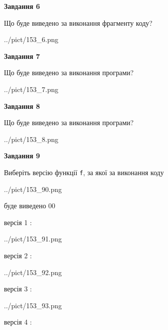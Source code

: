 \documentclass[12pt, ukrainian]{article}
\def\code#1{\Verb!#1!}
\begin{document}
{\begin {large}
{\begin {center}\textbf{Завдання 6}\end {center}}

Що буде виведено за виконання фрагменту коду?\par
\begin{center}
	{../pict/153_6.png}
\end{center}
\newpage

{\begin {center}\textbf{Завдання 7}\end {center}}

Що буде виведено за виконання програми?\par
\begin{center}
	{../pict/153_7.png}
\end{center}
\newpage

{\begin {center}\textbf{Завдання 8}\end {center}}

Що буде виведено за виконання програми?\par
\begin{center}
	{../pict/153_8.png}
\end{center}
\newpage

{\begin {center}\textbf{Завдання 9}\end {center}}

Виберіть версію функції \code{f}, за якої за виконання коду
\begin{center}
	{../pict/153_90.png}
\end{center}
буде виведено 00

\vspace{5mm}
версія 1 :

\begin{center}
	{../pict/153_91.png}
\end{center}
версія 2 :

\begin{center}
	{../pict/153_92.png}
\end{center}
версія 3 :

\begin{center}
	{../pict/153_93.png}
\end{center}
версія 4 :


\end{large}}
\end{document}
